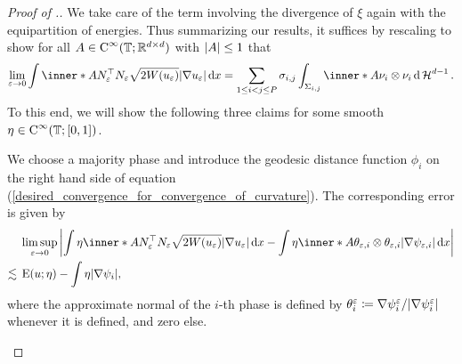 \begin{proof}[Proof of .]
	We take care of the term involving the divergence of $ \xi $ again with the 
	equipartition of energies. 
	Thus summarizing our results, it suffices by rescaling to show for all $ 
	A \in \operatorname{C}^{ \infty } ( \operatorname{\mathbb{T}} ; \mathbb{ R }^{ d \times d } ) $ with 
	$ \abs{ A } \leq 1 $ that
	\begin{equation}
		\label{desired_convergence_for_convergence_of_curvature}
		\lim_{ \varepsilon \to 0 }
		\int
		\inner*{ A }{ N_{ \varepsilon }^{ \top } N_{ \varepsilon } }
		\sqrt{ 2 W ( u_{ \varepsilon } ) }
		\abs{ \nabla u_{ \varepsilon } }
		\dd{ x }
		=
		\sum_{ 1 \leq i < j \leq P }
		\sigma_{ i , j }
		\int_{ \Sigma_{ i , j } }
		\inner*{ A }{ \nu_{ i } \otimes \nu_{ i } }
		\dd{ \hm^{ d - 1 } }.
	\end{equation}
	To this end, we will show the following three claims for some smooth 
	$ \eta \in \operatorname{C}^{ \infty } ( \operatorname{\mathbb{T}} ; [ 0 , 1 ] ) $.
	\begin{description}[wide=0pt]
		\item[Claim 1:]
		We choose a majority phase and introduce the geodesic distance function 
		$ \phi_{ i } $ 
		on the right hand side of equation 
		(\ref{desired_convergence_for_convergence_of_curvature}). 
		The corresponding error is given by
		\begin{align*}
			& \limsup_{ \varepsilon \to 0 }
			\abs{ 
				\int
				\eta 
				\inner*{ A }{ N_{ \varepsilon }^{ \top } N_{ \varepsilon } }
				\sqrt{ 2 W ( u_{ \varepsilon } ) } \abs{ \nabla u_{ \varepsilon 
				} } 
				\dd{ x }
				-
				\int
				\eta
				\inner*{ A }{ \theta_{ \varepsilon, i } \otimes \theta_{ 
						\varepsilon , i } }
				\abs{ \nabla \psi_{ \varepsilon , i } }
				\dd{ x }
			}
			\\
			\lesssim{} &
			\energy ( u ; \eta ) 
			-
			\int
			\eta
			\abs{ \nabla \psi_{ i } },
		\end{align*}
		where the approximate normal of the $ i$-th phase is defined by $ 
		\theta_{ 
		i }^{ \varepsilon } \coloneqq \nabla \psi_{ i }^{ \varepsilon } / \abs{ 
		\nabla \psi_{ i }^{ \varepsilon } } $ whenever it is defined, and zero 
		else.
		

\end{description}
\end{proof}
